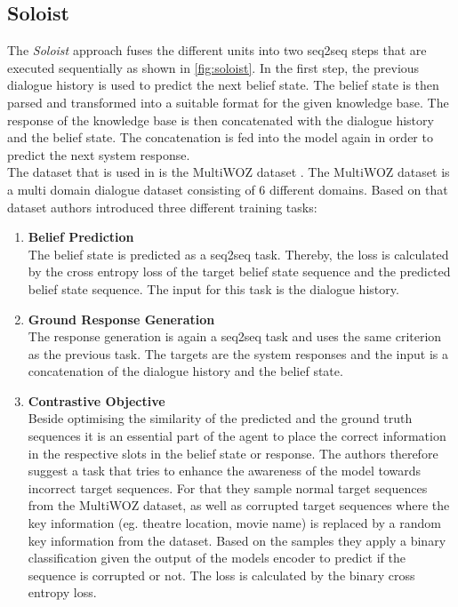 \documentclass[twocolumn]{tum-article}
\begin{document}
\subsection{Soloist}\label{sec:soloist}
The \textit{Soloist} \cite{peng2020soloist} approach fuses the different units into two seq2seq steps that are executed sequentially as shown in \autoref{fig:soloist}. In the first step, the previous dialogue history is used to predict the next belief state. The belief state is then parsed and transformed into a suitable format for the given knowledge base. The response of the knowledge base is then concatenated with the dialogue history and the belief state. The concatenation is fed into the model again in order to predict the next system response.\\
The dataset that is used in \cite{peng2020soloist} is the MultiWOZ dataset \cite{budzianowski2020multiwoz}. The MultiWOZ dataset is a multi domain dialogue dataset consisting of 6 different domains. Based on that dataset authors introduced three different training tasks:
\begin{enumerate}
\item \textbf{Belief Prediction}\\
The belief state is predicted as a seq2seq task. Thereby, the loss is calculated by the cross entropy loss of the target belief state sequence and the predicted belief state sequence. The input for this task is the dialogue history. 
\item \textbf{Ground Response Generation}\\
The response generation is again a seq2seq task and uses the same criterion as the previous task. The targets are the system responses and the input is a concatenation of the dialogue history and the belief state.
\item \textbf{Contrastive Objective}\\
Beside optimising the similarity of the predicted and the ground truth sequences it is an essential part of the agent to place the correct information in the respective slots in the belief state or response. The authors therefore suggest a task that tries to enhance the awareness of the model towards incorrect target sequences. For that they sample normal target sequences from the MultiWOZ dataset, as well as corrupted target sequences where the key information (eg. theatre location, movie name) is replaced by a random key information from the dataset. Based on the samples they apply a binary classification given the output of the models encoder to predict if the sequence is corrupted or not. The loss is calculated by the binary cross entropy loss. 
\end{enumerate}
\end{document}
